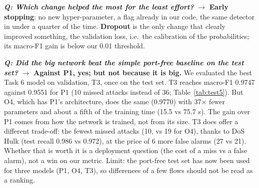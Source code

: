 \documentclass[9pt]{extarticle}
\newcommand{\Q}[1]{\textbf{\emph{Q: #1}}}
\newcommand{\run}[1]{\textsf{#1}}
\begin{document}
\Q{Which change helped the most for the least effort?} $\rightarrow$ \textbf{Early stopping}: no new hyper-parameter, a flag already in our code, the same detector in under a quarter of the time. \textbf{Dropout} is the only change that clearly improved something, the validation loss, i.e.\ the calibration of the probabilities; its macro-F1 gain is below our 0.01 threshold.

\Q{Did the big network beat the simple port-free baseline on the test set?} $\rightarrow$ \textbf{Against \run{P1}, yes; but not because it is big.} We evaluated the best Task 6 model on validation, \run{T3}, once on the test set. \run{T3} reaches macro-F1 0.9747 against 0.9551 for \run{P1} (10 missed attacks instead of 36; Table~\ref{tab:test5}). But \run{O4}, which has \run{P1}'s architecture, does the same (0.9770) with 37$\times$ fewer parameters and about a fifth of the training time (15.5 vs 75.7 s). The gain over \run{P1} comes from how the network is trained, not from its size. \run{T3} does offer a different trade-off: the fewest missed attacks (10, vs 19 for \run{O4}), thanks to DoS Hulk (test recall 0.986 vs 0.972), at the price of 6 more false alarms (27 vs 21). Whether that is worth it is a deployment question (the cost of a miss vs a false alarm), not a win on our metric. Limit: the port-free test set has now been used for three models (\run{P1}, \run{O4}, \run{T3}), so differences of a few flows should not be read as a ranking.

\end{document}
